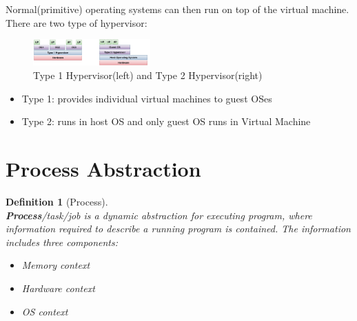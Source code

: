 \documentclass[12pt]{article}
\newtheorem{definition}{Definition}[section]
\theoremstyle{definition}
\begin{document}
Normal(primitive) operating systems can then run on top of the virtual machine.\\
There are two type of hypervisor:
\begin{figure}[h]
\centering
\includegraphics[width = 0.4\textwidth]{1_8.png}
\caption{Type 1 Hypervisor(left) and Type 2 Hypervisor(right)}
\end{figure}
\begin{itemize}
  \item Type 1: provides individual virtual machines to guest OSes
  \item Type 2: runs in host OS and only guest OS runs in Virtual Machine
\end{itemize}

\section{Process Abstraction}
\begin{definition}[Process]
\hfill\\\normalfont \textbf{Process}/task/job is a dynamic abstraction for executing program, where information required to describe a running program is contained. The information includes three components:
\begin{itemize}
  \item Memory context
  \item Hardware context
  \item OS context
\end{itemize}
\end{definition}
\end{document}
